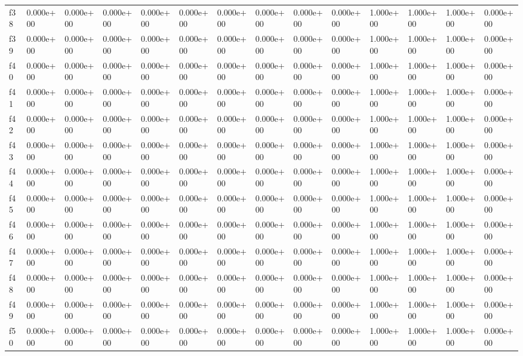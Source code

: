 \begin{table}
\begin{tabular}{llllllllllllll}
f38 & 0.000e+00 & 0.000e+00 & 0.000e+00 & 0.000e+00 & 0.000e+00 & 0.000e+00 & 0.000e+00 & 0.000e+00 & 0.000e+00 & 1.000e+00 & 1.000e+00 & 1.000e+00 & 0.000e+00 \\
f39 & 0.000e+00 & 0.000e+00 & 0.000e+00 & 0.000e+00 & 0.000e+00 & 0.000e+00 & 0.000e+00 & 0.000e+00 & 0.000e+00 & 1.000e+00 & 1.000e+00 & 1.000e+00 & 0.000e+00 \\
f40 & 0.000e+00 & 0.000e+00 & 0.000e+00 & 0.000e+00 & 0.000e+00 & 0.000e+00 & 0.000e+00 & 0.000e+00 & 0.000e+00 & 1.000e+00 & 1.000e+00 & 1.000e+00 & 0.000e+00 \\
f41 & 0.000e+00 & 0.000e+00 & 0.000e+00 & 0.000e+00 & 0.000e+00 & 0.000e+00 & 0.000e+00 & 0.000e+00 & 0.000e+00 & 1.000e+00 & 1.000e+00 & 1.000e+00 & 0.000e+00 \\
f42 & 0.000e+00 & 0.000e+00 & 0.000e+00 & 0.000e+00 & 0.000e+00 & 0.000e+00 & 0.000e+00 & 0.000e+00 & 0.000e+00 & 1.000e+00 & 1.000e+00 & 1.000e+00 & 0.000e+00 \\
f43 & 0.000e+00 & 0.000e+00 & 0.000e+00 & 0.000e+00 & 0.000e+00 & 0.000e+00 & 0.000e+00 & 0.000e+00 & 0.000e+00 & 1.000e+00 & 1.000e+00 & 1.000e+00 & 0.000e+00 \\
f44 & 0.000e+00 & 0.000e+00 & 0.000e+00 & 0.000e+00 & 0.000e+00 & 0.000e+00 & 0.000e+00 & 0.000e+00 & 0.000e+00 & 1.000e+00 & 1.000e+00 & 1.000e+00 & 0.000e+00 \\
f45 & 0.000e+00 & 0.000e+00 & 0.000e+00 & 0.000e+00 & 0.000e+00 & 0.000e+00 & 0.000e+00 & 0.000e+00 & 0.000e+00 & 1.000e+00 & 1.000e+00 & 1.000e+00 & 0.000e+00 \\
f46 & 0.000e+00 & 0.000e+00 & 0.000e+00 & 0.000e+00 & 0.000e+00 & 0.000e+00 & 0.000e+00 & 0.000e+00 & 0.000e+00 & 1.000e+00 & 1.000e+00 & 1.000e+00 & 0.000e+00 \\
f47 & 0.000e+00 & 0.000e+00 & 0.000e+00 & 0.000e+00 & 0.000e+00 & 0.000e+00 & 0.000e+00 & 0.000e+00 & 0.000e+00 & 1.000e+00 & 1.000e+00 & 1.000e+00 & 0.000e+00 \\
f48 & 0.000e+00 & 0.000e+00 & 0.000e+00 & 0.000e+00 & 0.000e+00 & 0.000e+00 & 0.000e+00 & 0.000e+00 & 0.000e+00 & 1.000e+00 & 1.000e+00 & 1.000e+00 & 0.000e+00 \\
f49 & 0.000e+00 & 0.000e+00 & 0.000e+00 & 0.000e+00 & 0.000e+00 & 0.000e+00 & 0.000e+00 & 0.000e+00 & 0.000e+00 & 1.000e+00 & 1.000e+00 & 1.000e+00 & 0.000e+00 \\
f50 & 0.000e+00 & 0.000e+00 & 0.000e+00 & 0.000e+00 & 0.000e+00 & 0.000e+00 & 0.000e+00 & 0.000e+00 & 0.000e+00 & 1.000e+00 & 1.000e+00 & 1.000e+00 & 0.000e+00 \\

\end{tabular}
\end{table}
